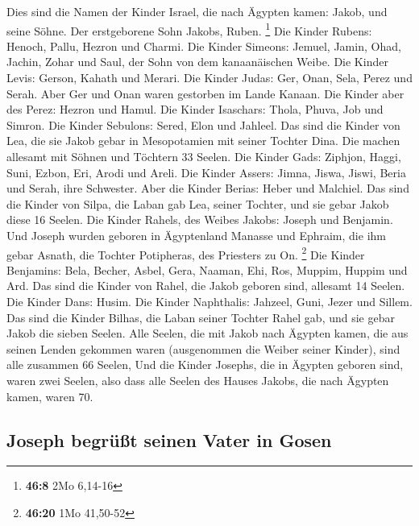  Dies sind die Namen der Kinder Israel, die nach Ägypten
kamen: Jakob, und seine Söhne. Der erstgeborene Sohn Jakobs, Ruben.
\footnote{\textbf{46:8} 2Mo 6,14-16}  Die Kinder Rubens:
Henoch, Pallu, Hezron und Charmi.  Die Kinder Simeons:
Jemuel, Jamin, Ohad, Jachin, Zohar und Saul, der Sohn von dem
kanaanäischen Weibe.  Die Kinder Levis: Gerson, Kahath
und Merari.  Die Kinder Judas: Ger, Onan, Sela, Perez und
Serah. Aber Ger und Onan waren gestorben im Lande Kanaan. Die Kinder
aber des Perez: Hezron und Hamul.  Die Kinder Isaschars:
Thola, Phuva, Job und Simron.  Die Kinder Sebulons:
Sered, Elon und Jahleel.  Das sind die Kinder von Lea,
die sie Jakob gebar in Mesopotamien mit seiner Tochter Dina. Die machen
allesamt mit Söhnen und Töchtern 33 Seelen.  Die Kinder
Gads: Ziphjon, Haggi, Suni, Ezbon, Eri, Arodi und Areli. 
Die Kinder Assers: Jimna, Jiswa, Jiswi, Beria und Serah, ihre Schwester.
Aber die Kinder Berias: Heber und Malchiel.  Das sind die
Kinder von Silpa, die Laban gab Lea, seiner Tochter, und sie gebar Jakob
diese 16 Seelen.  Die Kinder Rahels, des Weibes Jakobs:
Joseph und Benjamin.  Und Joseph wurden geboren in
Ägyptenland Manasse und Ephraim, die ihm gebar Asnath, die Tochter
Potipheras, des Priesters zu On. \footnote{\textbf{46:20} 1Mo 41,50-52}
 Die Kinder Benjamins: Bela, Becher, Asbel, Gera, Naaman,
Ehi, Ros, Muppim, Huppim und Ard.  Das sind die Kinder
von Rahel, die Jakob geboren sind, allesamt 14 Seelen. 
Die Kinder Dans: Husim.  Die Kinder Naphthalis: Jahzeel,
Guni, Jezer und Sillem.  Das sind die Kinder Bilhas, die
Laban seiner Tochter Rahel gab, und sie gebar Jakob die sieben Seelen.
 Alle Seelen, die mit Jakob nach Ägypten kamen, die aus
seinen Lenden gekommen waren (ausgenommen die Weiber seiner Kinder),
sind alle zusammen 66 Seelen,  Und die Kinder Josephs,
die in Ägypten geboren sind, waren zwei Seelen, also dass alle Seelen
des Hauses Jakobs, die nach Ägypten kamen, waren 70.

\hypertarget{joseph-begruxfcuxdft-seinen-vater-in-gosen}{%
\subsection{Joseph begrüßt seinen Vater in
Gosen}\label{joseph-begruxfcuxdft-seinen-vater-in-gosen}}

